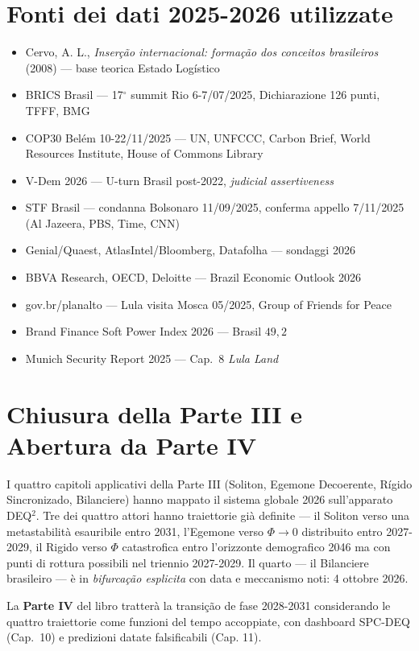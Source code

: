 \section{Fonti dei dati 2025-2026
utilizzate}\label{fonti-dei-dati-2025-2026-utilizzate}

\begin{itemize}
\tightlist
\item
  Cervo, A. L., \emph{Inserção internacional: formação dos conceitos
  brasileiros} (2008) --- base teorica Estado Logístico
\item
  BRICS Brasil --- 17$^\circ$ summit Rio 6-7/07/2025, Dichiarazione 126 punti,
  TFFF, BMG
\item
  COP30 Belém 10-22/11/2025 --- UN, UNFCCC, Carbon Brief, World
  Resources Institute, House of Commons Library
\item
  V-Dem 2026 --- U-turn Brasil post-2022, \emph{judicial assertiveness}
\item
  STF Brasil --- condanna Bolsonaro 11/09/2025, conferma appello
  7/11/2025 (Al Jazeera, PBS, Time, CNN)
\item
  Genial/Quaest, AtlasIntel/Bloomberg, Datafolha --- sondaggi 2026
\item
  BBVA Research, OECD, Deloitte --- Brazil Economic Outlook 2026
\item
  gov.br/planalto --- Lula visita Mosca 05/2025, Group of Friends for
  Peace
\item
  Brand Finance Soft Power Index 2026 --- Brasil \(49{,}2\)
\item
  Munich Security Report 2025 --- Cap.~8 \emph{Lula Land}
\end{itemize}



\section{Chiusura della Parte III e Abertura da Parte
IV}\label{chiusura-della-parte-iii-e-apertura-della-parte-iv}

I quattro capitoli applicativi della Parte III (Soliton, Egemone
Decoerente, Rígido Sincronizado, Bilanciere) hanno mappato il sistema
globale 2026 sull'apparato DEQ$^2$. Tre dei quattro attori hanno
traiettorie già definite --- il Soliton verso una metastabilità
esauribile entro 2031, l'Egemone verso \(\Phi \to 0\) distribuito entro
2027-2029, il Rigido verso \(\Phi\) catastrofica entro l'orizzonte
demografico 2046 ma con punti di rottura possibili nel triennio
2027-2029. Il quarto --- il Bilanciere brasileiro --- è in
\emph{bifurcação esplicita} con data e meccanismo noti: 4 ottobre
2026.

La \textbf{Parte IV} del libro tratterà la transição de fase 2028-2031
considerando le quattro traiettorie come funzioni del tempo accoppiate,
con dashboard SPC-DEQ (Cap.~10) e predizioni datate falsificabili (Cap.
11).


